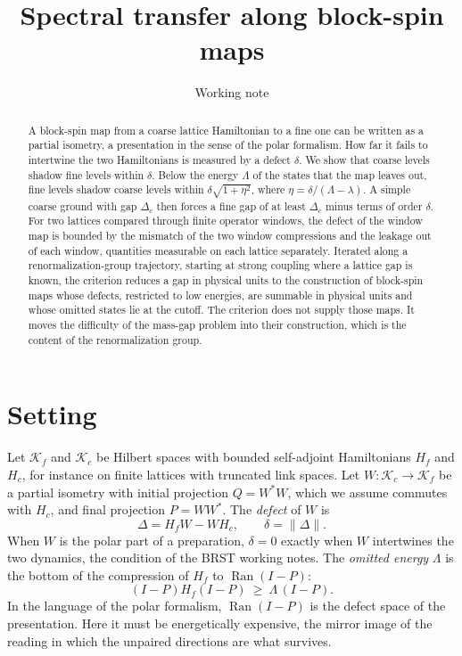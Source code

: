 \documentclass[11pt]{article}
\title{Spectral transfer along block-spin maps}
\author{Working note}
\date{}
\theoremstyle{remark}
\newcommand{\K}{\mathcal K}
\newcommand{\Ran}{\operatorname{Ran}}
\begin{document}
\maketitle

\begin{abstract}
\noindent
A block-spin map from a coarse lattice Hamiltonian to a fine one can be written as a partial isometry, a presentation in the sense of the polar formalism. How far it fails to intertwine the two Hamiltonians is measured by a defect $\delta$. We show that coarse levels shadow fine levels within $\delta$. Below the energy $\Lambda$ of the states that the map leaves out, fine levels shadow coarse levels within $\delta\sqrt{1+\eta^2}$, where $\eta=\delta/(\Lambda-\lambda)$. A simple coarse ground with gap $\Delta_c$ then forces a fine gap of at least $\Delta_c$ minus terms of order $\delta$. For two lattices compared through finite operator windows, the defect of the window map is bounded by the mismatch of the two window compressions and the leakage out of each window, quantities measurable on each lattice separately. Iterated along a renormalization-group trajectory, starting at strong coupling where a lattice gap is known, the criterion reduces a gap in physical units to the construction of block-spin maps whose defects, restricted to low energies, are summable in physical units and whose omitted states lie at the cutoff. The criterion does not supply those maps. It moves the difficulty of the mass-gap problem into their construction, which is the content of the renormalization group.
\end{abstract}

\section{Setting}

Let $\K_f$ and $\K_c$ be Hilbert spaces with bounded self-adjoint Hamiltonians $H_f$ and $H_c$, for instance on finite lattices with truncated link spaces. Let $W:\K_c\to\K_f$ be a partial isometry with initial projection $Q=W^*W$, which we assume commutes with $H_c$, and final projection $P=WW^*$. The \emph{defect} of $W$ is
\[
 \Delta=H_fW-WH_c,\qquad \delta=\|\Delta\| .
\]
When $W$ is the polar part of a preparation, $\delta=0$ exactly when $W$ intertwines the two dynamics, the condition of the BRST working notes. The \emph{omitted energy} $\Lambda$ is the bottom of the compression of $H_f$ to $\Ran(I-P)$:
\[
 (I-P)H_f(I-P)\ \ge\ \Lambda\,(I-P).
\]
In the language of the polar formalism, $\Ran(I-P)$ is the defect space of the presentation. Here it must be energetically expensive, the mirror image of the reading in which the unpaired directions are what survives.
\end{document}
